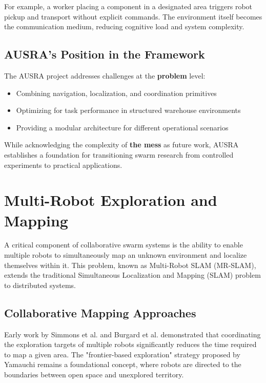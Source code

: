 For example, a worker placing a component in a designated area triggers robot pickup and transport without explicit commands. The environment itself becomes the communication medium, reducing cognitive load and system complexity.

\subsection{AUSRA's Position in the Framework}
\label{subsec:ausra_framework}

The AUSRA project addresses challenges at the \textbf{problem} level:
\begin{itemize}
    \item Combining navigation, localization, and coordination primitives
    \item Optimizing for task performance in structured warehouse environments
    \item Providing a modular architecture for different operational scenarios
\end{itemize}

While acknowledging the complexity of \textbf{the mess} as future work, AUSRA establishes a foundation for transitioning swarm research from controlled experiments to practical applications.



\section{Multi-Robot Exploration and Mapping}
\label{sec:mr_slam}

A critical component of collaborative swarm systems is the ability to enable multiple robots to simultaneously map an unknown environment and localize themselves within it. This problem, known as Multi-Robot SLAM (MR-SLAM), extends the traditional Simultaneous Localization and Mapping (SLAM) problem to distributed systems.

\subsection{Collaborative Mapping Approaches}
Early work by Simmons et al. \cite{simmons2000coordination} and Burgard et al. \cite{burgard2005coordinated} demonstrated that coordinating the exploration targets of multiple robots significantly reduces the time required to map a given area. The "frontier-based exploration" strategy proposed by Yamauchi \cite{yamauchi1997frontier} remains a foundational concept, where robots are directed to the boundaries between open space and unexplored territory.

